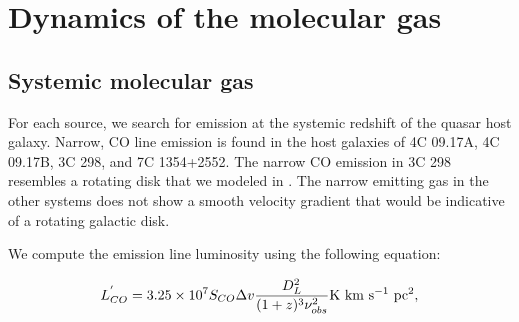 \documentclass[twocolumn]{aastex63}
\begin{document}
\section{Dynamics of the molecular gas}\label{sec:dynamics}

\subsection{Systemic molecular gas}

For each source, we search for emission at the systemic redshift of the quasar host galaxy. Narrow, CO line emission is found in the host galaxies of 4C 09.17A, 4C 09.17B, 3C 298, and 7C 1354+2552. The narrow CO emission in 3C 298 resembles a rotating disk that we modeled in \citet{Vayner17}. The narrow emitting gas in the other systems does not show a smooth velocity gradient that would be indicative of a rotating galactic disk. 

\noindent We compute the emission line luminosity using the following equation:

\begin{equation}
   L^{'}_{CO}=3.25 \times 10^{7}S_{CO}\Delta v \frac{D^{2}_{L}}{(1+z)^{3}\nu_{obs}^{2}} \rm K~km~s^{-1}~pc^{2},  
\end{equation} 
\end{document}
